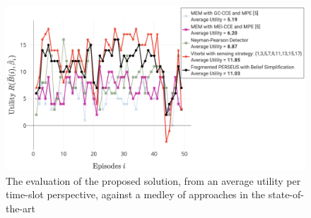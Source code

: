 \begin{figure} [htb]
    \centerline{
    \includegraphics[width = 1.0\textwidth]{PerformanceEvaluation.png}}
    \caption{The evaluation of the proposed solution, from an average utility per time-slot perspective, against a medley of approaches in the state-of-the-art}
    \label{Fig. 5}
\end{figure}

